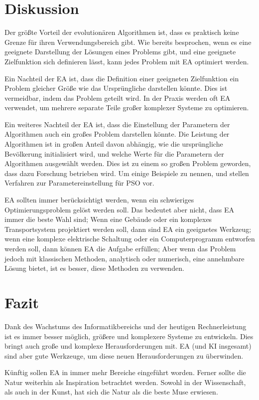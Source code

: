 \documentclass[twoside,twocolumn]{article}
\begin{document}

\section{Diskussion}
Der größte Vorteil der evolutionären Algorithmen ist, dass es praktisch keine Grenze für ihren Verwendungsbereich gibt. Wie bereits besprochen, wenn es eine geeignete Darstellung der Lösungen eines Problems gibt, und eine geeignete Zielfunktion sich definieren lässt, kann jedes Problem mit EA optimiert werden.\par
Ein Nachteil der EA ist, dass die Definition einer geeigneten Zielfunktion ein Problem gleicher Größe wie das Ursprüngliche darstellen könnte. Dies ist vermeidbar, indem das Problem geteilt wird. In der Praxis werden oft EA verwendet, um mehrere separate Teile großer komplexer Systeme zu optimieren.\par
Ein weiteres Nachteil der EA ist, dass die Einstellung der Parametern der Algorithmen auch ein großes Problem darstellen könnte. Die Leistung der Algorithmen ist in großen Anteil davon abhängig, wie die ursprüngliche Bevölkerung initialisiert wird, und welche Werte für die Parametern der Algorithmen ausgewählt werden. Dies ist zu einem so großen Problem geworden, dass dazu Forschung betrieben wird. Um einige Beispiele zu nennen, \cite{pso_tuning_a} und \cite{pso_tuning_c} stellen Verfahren zur Parametereinstellung für PSO vor.\par
EA sollten immer berücksichtigt werden, wenn ein schwieriges Optimierungsproblem gelöst werden soll. Das bedeutet aber nicht, dass EA immer die beste Wahl sind; Wenn eine Gebäude oder ein komplexes Transportsystem projektiert werden soll, dann sind EA ein geeignetes Werkzeug; wenn eine komplexe elektrische Schaltung oder ein Computerprogramm entworfen werden soll, dann können EA die Aufgabe erfüllen; Aber wenn das Problem jedoch mit klassischen Methoden, analytisch oder numerisch, eine annehmbare Lösung bietet, ist es besser, diese Methoden zu verwenden.


\section{Fazit}
Dank des Wachstums des Informatikbereichs und der heutigen Rechnerleistung ist es immer besser möglich, größere und komplexere Systeme zu entwickeln. Dies bringt auch große und komplexe Herausforderungen mit. EA (und KI insgesamt) sind aber gute Werkzeuge, um diese neuen Herausforderungen zu überwinden.\par
Künftig sollen EA in immer mehr Bereiche eingeführt worden. Ferner sollte die Natur weiterhin als Inspiration betrachtet werden. Sowohl in der Wissenschaft, als auch in der Kunst, hat sich die Natur als die beste Muse erwiesen.
\end{document}
